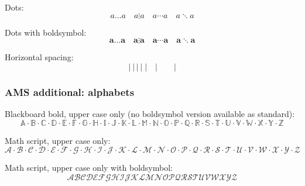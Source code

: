 \documentclass[12pt,a4paper]{article}
\theoremstyle{clearprint}
\begin{document}
\noindent 
Dots:
\begin{equation}
a \ldots a \quad a \vdots a \quad  a \cdots a \quad  a \ddots a
\end{equation}

\noindent 
Dots with boldsymbol:
\begin{equation}
\boldsymbol{a \ldots a \quad a \vdots a \quad  a \cdots a \quad  a \ddots a}
\end{equation}

\noindent 
Horizontal spacing:
\begin{equation}
|~|\,|\:|\;|\quad | \qquad |
\end{equation}

\subsubsection[AMS alphabets]{AMS additional: alphabets}

\noindent 
Blackboard bold, upper case only (no boldsymbol version available as standard):
\begin{equation}
\mathbb{A} \cdot \mathbb{B} \cdot \mathbb{C} \cdot \mathbb{D} \cdot \mathbb{E} \cdot \mathbb{F} \cdot \mathbb{G} \cdot \mathbb{H} \cdot \mathbb{I} \cdot \mathbb{J} \cdot \mathbb{K} \cdot \mathbb{L} \cdot \mathbb{M} \cdot \mathbb{N} \cdot \mathbb{O} \cdot \mathbb{P} \cdot \mathbb{Q} \cdot \mathbb{R} \cdot \mathbb{S} \cdot \mathbb{T} \cdot \mathbb{U} \cdot \mathbb{V} \cdot \mathbb{W} \cdot \mathbb{X} \cdot \mathbb{Y} \cdot \mathbb{Z}
\end{equation}

\noindent
Math script, upper case only:
\begin{equation}
\mathscr{A} \cdot \mathscr{B} \cdot \mathscr{C} \cdot \mathscr{D} \cdot \mathscr{E} \cdot \mathscr{F} \cdot \mathscr{G} \cdot \mathscr{H} \cdot \mathscr{I} \cdot \mathscr{J} \cdot \mathscr{K} \cdot \mathscr{L} \cdot \mathscr{M} \cdot \mathscr{N} \cdot \mathscr{O} \cdot \mathscr{P} \cdot \mathscr{Q} \cdot \mathscr{R} \cdot \mathscr{S} \cdot \mathscr{T} \cdot \mathscr{U} \cdot \mathscr{V} \cdot \mathscr{W} \cdot \mathscr{X} \cdot \mathscr{Y} \cdot \mathscr{Z}
\end{equation}

\noindent
Math script, upper case only with boldsymbol:
\begin{equation}
\boldsymbol{\mathscr{A}  \mathscr{B}  \mathscr{C}  \mathscr{D}  \mathscr{E}  \mathscr{F}  \mathscr{G}  \mathscr{H}  \mathscr{I}  \mathscr{J}  \mathscr{K}  \mathscr{L}  \mathscr{M}  \mathscr{N}  \mathscr{O}  \mathscr{P}  \mathscr{Q}  \mathscr{R}  \mathscr{S}  \mathscr{T}  \mathscr{U}  \mathscr{V}  \mathscr{W}  \mathscr{X}  \mathscr{Y}  \mathscr{Z}}
\end{equation}
\end{document}
